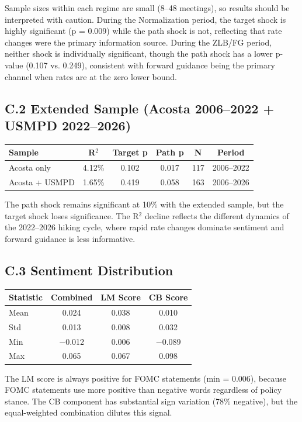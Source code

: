 \documentclass[12pt]{article}
\begin{document}
Sample sizes within each regime are small (8--48 meetings), so results should be interpreted with caution. During the Normalization period, the target shock is highly significant (p = 0.009) while the path shock is not, reflecting that rate changes were the primary information source. During the ZLB/FG period, neither shock is individually significant, though the path shock has a lower p-value (0.107 vs. 0.249), consistent with forward guidance being the primary channel when rates are at the zero lower bound.

\subsection{C.2 Extended Sample (Acosta 2006--2022 + USMPD 2022--2026)}

\begin{table}[htbp]\centering
\begin{tabular}{lccccc}\toprule
Sample & R$^2$ & Target p & Path p & N & Period \\\midrule
Acosta only & 4.12\% & 0.102 & 0.017 & 117 & 2006--2022 \\
Acosta + USMPD & 1.65\% & 0.419 & 0.058 & 163 & 2006--2026 \\
\bottomrule\end{tabular}
\end{table}

The path shock remains significant at 10\% with the extended sample, but the target shock loses significance. The R$^2$ decline reflects the different dynamics of the 2022--2026 hiking cycle, where rapid rate changes dominate sentiment and forward guidance is less informative.

\subsection{C.3 Sentiment Distribution}

\begin{table}[htbp]\centering
\begin{tabular}{lccc}\toprule
Statistic & Combined & LM Score & CB Score \\\midrule
Mean & 0.024 & 0.038 & 0.010 \\
Std & 0.013 & 0.008 & 0.032 \\
Min & $-$0.012 & 0.006 & $-$0.089 \\
Max & 0.065 & 0.067 & 0.098 \\
\bottomrule\end{tabular}
\end{table}

The LM score is always positive for FOMC statements (min = 0.006), because FOMC statements use more positive than negative words regardless of policy stance. The CB component has substantial sign variation (78\% negative), but the equal-weighted combination dilutes this signal.
\end{document}
